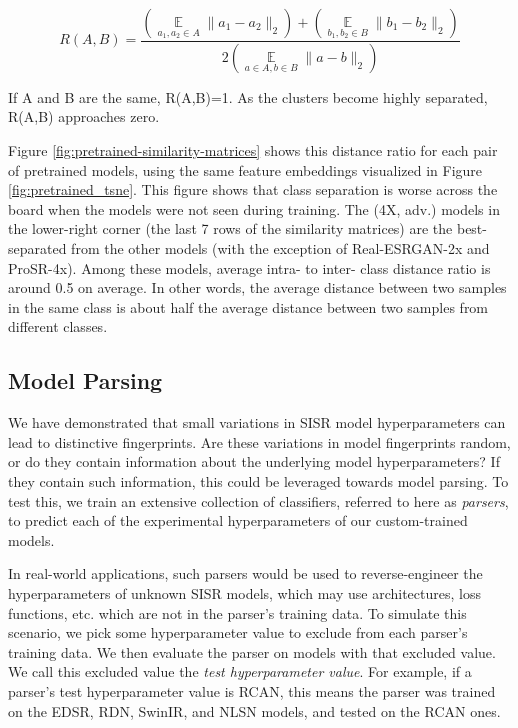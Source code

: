 \documentclass[10pt]{article} %
\DeclareMathOperator*{\EV}{\mathbb{E}}
\begin{document}
\[
R(A, B) = \frac{ \left(\underset{a_1,a_2 \in A}{\EV}\lVert a_1 - a_2 \rVert_2 \right) +  \left( \underset{b_1,b_2 \in B}{\EV}\lVert b_1 - b_2 \rVert_2 \right) } {2 \left( \underset{a \in A, b \in B}{\EV}\lVert a - b \rVert_2 \right) }
\]


If A and B are the same, R(A,B)=1. As the clusters become highly separated, R(A,B) approaches zero.

Figure \ref{fig:pretrained-similarity-matrices} shows this distance ratio for each pair of pretrained models, using the same feature embeddings visualized in Figure \ref{fig:pretrained_tsne}. This figure shows that class separation is worse across the board when the models were not seen during training. The (4X, adv.) models in the lower-right corner (the last 7 rows of the similarity matrices) are the best-separated from the other models (with the exception of Real-ESRGAN-2x and ProSR-4x). Among these models, average intra- to inter- class distance ratio is around 0.5 on average. In other words, the average distance between two samples in the same class is about half the average distance between two samples from different classes.

\subsection{Model Parsing}
\label{sec:model_parsing}

We have demonstrated that small variations in SISR model hyperparameters can lead to distinctive fingerprints. Are these variations in model fingerprints random, or do they contain information about the underlying model hyperparameters? If they contain such information, this could be leveraged towards model parsing. To test this, we train an extensive collection of classifiers, referred to here as \textit{parsers}, to predict each of the experimental hyperparameters of our custom-trained models. 

In real-world applications, such parsers would be used to reverse-engineer the hyperparameters of unknown SISR models, which may use architectures, loss functions, etc. which are not in the parser's training data. To simulate this scenario, we pick some hyperparameter value to exclude from each parser's training data. We then evaluate the parser on models with that excluded value. We call this excluded value the \textit{test hyperparameter value}. For example, if a parser's test hyperparameter value is RCAN, this means the parser was trained on the EDSR, RDN, SwinIR, and NLSN models, and tested on the RCAN ones. 
\end{document}
